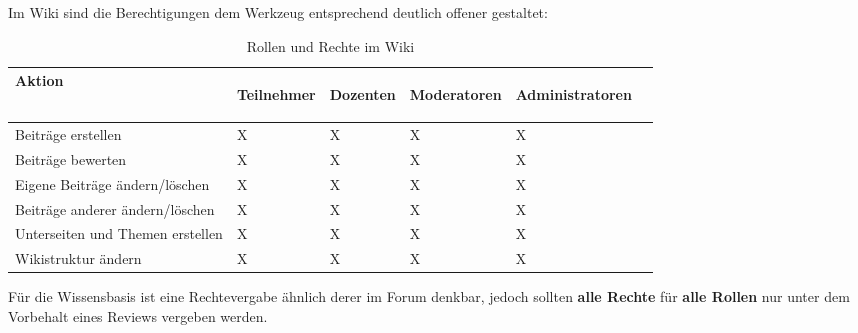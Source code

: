 Im Wiki sind die Berechtigungen dem Werkzeug entsprechend deutlich offener gestaltet:

\begin{table}[H]
\begin{center}
\begin{footnotesize}
\begin{tabular}{| l | C{1cm} | C{1cm} | C{1cm} | C{1cm} | C{1cm} |}  \hline                       
  \textbf{Aktion} & 
	\begin{turn}{90}\textbf{Teilnehmer\vspace{0.1cm}}\end{turn} & 
	\begin{turn}{90}\textbf{Dozenten}\end{turn}  & 
	\begin{turn}{90}\textbf{Moderatoren}\end{turn} & 
	\begin{turn}{90}\textbf{Administratoren}\end{turn} \\ \hline 
	Beiträge erstellen					& X   & X   & X  & X    \\  \hline  
	Beiträge bewerten		& X   & X   & X  & X    \\  \hline  
	Eigene Beiträge ändern/löschen		& X   & X   & X  & X    \\  \hline  
	Beiträge anderer ändern/löschen		& X   & X    & X  & X    \\  \hline  
	Unterseiten und Themen erstellen	& X    & X    & X  & X    \\  \hline  
	Wikistruktur ändern	& X    & X    & X  & X    \\  \hline  
\end{tabular}
\end{footnotesize}
\caption{Rollen und Rechte im Wiki}
\label{tab:rundrwiki}
\end{center}
\end{table}

Für die Wissensbasis ist eine Rechtevergabe ähnlich derer im Forum denkbar, jedoch sollten \textbf{alle Rechte} für \textbf{alle Rollen} nur unter dem Vorbehalt eines Reviews vergeben werden.




